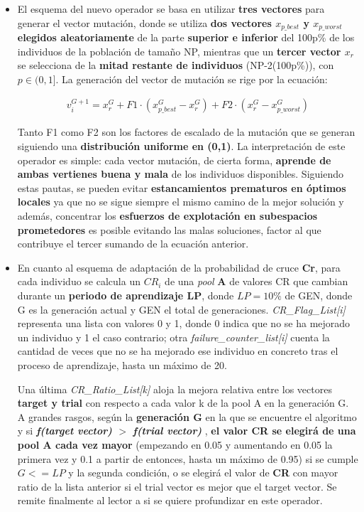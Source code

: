 \begin{enumerate}
	\begin{itemize}
		\item El esquema del nuevo operador se basa en utilizar \textbf{tres vectores} para generar el vector mutación, donde se utiliza \textbf{dos vectores $x_{p\_best}$ y $x_{p\_worst}$ elegidos aleatoriamente} de la parte \textbf{superior e inferior} del 100p\% de los individuos de la población de tamaño NP, mientras que un \textbf{tercer vector $x_r$} se selecciona de la \textbf{mitad restante de individuos} (NP-2(100p\%)), con $p \in (0,1]$. La generación del vector de mutación se rige por la ecuación:
		
		\begin{equation}\label{eq:EADE_Mutation}
		\begin{gathered}
		v_i^{G+1} = x_r^G + F1 \cdot (x_{p\_best}^G - x_r^G) + F2 \cdot (x_r^G - x_{p\_worst}^G)
		\end{gathered}
		\end{equation}
		
		Tanto F1 como F2 son los factores de escalado de la mutación que se generan siguiendo una \textbf{distribución uniforme en (0,1)}. La interpretación de este operador es simple: cada vector mutación, de cierta forma, \textbf{aprende de ambas vertienes buena y mala} de los individuos disponibles. Siguiendo estas pautas, se pueden evitar \textbf{estancamientos prematuros en óptimos locales} ya que no se sigue siempre el mismo camino de la mejor solución y además, concentrar los \textbf{esfuerzos de explotación en subespacios prometedores} es posible evitando las malas soluciones, factor al que contribuye el tercer sumando de la ecuación anterior.
		
		\item En cuanto al esquema de adaptación de la probabilidad de cruce \textbf{Cr}, para cada individuo se calcula un $CR_i$ de una \textit{pool} \textbf{A} de valores CR que cambian durante un \textbf{periodo de aprendizaje LP}, donde $LP = 10\%$ de GEN, donde G es la generación actual y GEN el total de generaciones. \textit{CR\_Flag\_List[i]} representa una lista con valores 0 y 1, donde 0 indica que no se ha mejorado un individuo y 1 el caso contrario; otra \textit{failure\_counter\_list[i]} cuenta la cantidad de veces que no se ha mejorado ese individuo en concreto tras el proceso de aprendizaje, hasta un máximo de 20. 
		
		Una última \textit{CR\_Ratio\_List[k]} aloja la mejora relativa entre los vectores \textbf{target y trial} con respecto a cada valor k de la pool A en la generación G. A grandes rasgos, según la \textbf{generación G} en la que se encuentre el algoritmo y si \textbf{\textit{f(target vector)} $>$ \textit{f(trial vector)} }, \textbf{el valor CR se elegirá de una pool A cada vez mayor} (empezando en 0.05 y aumentando en 0.05 la primera vez y 0.1 a partir de entonces, hasta un máximo de 0.95) si se cumple $G<=LP$ y la segunda condición, o se elegirá el valor de \textbf{CR} con mayor ratio de la lista anterior si el trial vector es mejor que el target vector. Se remite finalmente al lector a \cite{ANDE} si se quiere profundizar en este operador.
	\end{itemize}


\end{enumerate}
